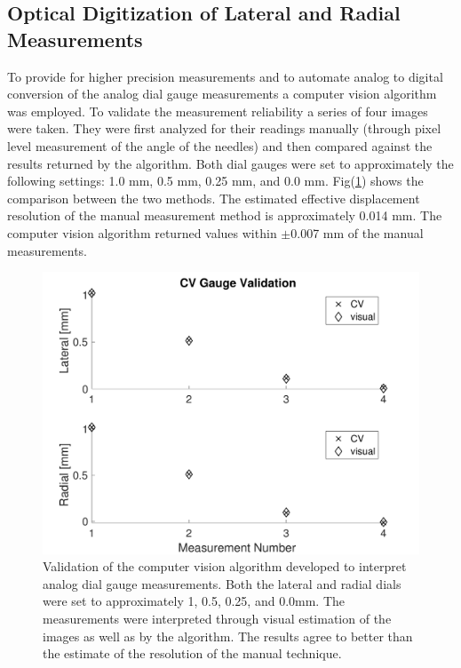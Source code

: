 \documentclass[journal]{IEEEtran}
\begin{document}
\subsection{Optical Digitization of Lateral and Radial Measurements}
To provide for higher precision measurements and to automate analog to digital conversion of the analog dial gauge measurements a computer vision algorithm was employed.  To validate the measurement reliability a series of four images were taken.  They were first analyzed for their readings manually (through pixel level measurement of the angle of the needles) and then compared against the results returned by the algorithm.  Both dial gauges were set to approximately the following settings:  1.0 mm, 0.5 mm, 0.25 mm, and 0.0 mm.  Fig(\ref{fig:cv}) shows the comparison between the two methods.  The estimated effective displacement resolution of the manual measurement method is approximately 0.014 mm.  The computer vision algorithm returned values within $\pm$0.007 mm of the manual measurements. 
\begin{figure}[!t]
\centering
\includegraphics[width=3.25 in]{./figs/CV}
\caption{Validation of the computer vision algorithm developed to interpret analog dial gauge measurements.  Both the lateral and radial dials were set to approximately 1, 0.5, 0.25, and 0.0mm.  The measurements were interpreted through visual estimation of the images as well as by the algorithm. The results agree to better than the estimate of the resolution of the manual technique.}
\label{fig:cv}
\end{figure}
\end{document}
